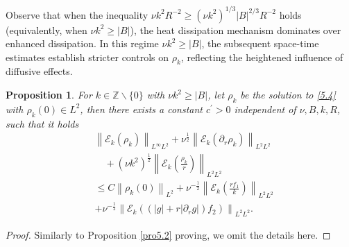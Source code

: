 \documentclass[final, 12pt,reqno]{amsart}
\newtheorem{proposition}[theorem]{\bf Proposition}
\numberwithin{equation}{section}
\begin{document}
Observe that when the inequality  $ \nu k^2R^{-2} \geq( \nu k^2)^{1/3}|B|^{2/3}R^{-2}$ holds (equivalently, when $\nu k^2 \geq  |B|$), the heat dissipation mechanism dominates over enhanced dissipation. In this regime $\nu k^2 \geq  |B|$, the subsequent space-time estimates establish stricter controls on  $\rho_k$, reflecting the heightened influence of diffusive effects.
\begin{proposition} \label{pro5.8}
    For $k \in \mathbb{Z} \backslash\{0\}$ with $\nu k^2\geq |B|$, let $\rho_k$ be the solution to \eqref{5.4} with $\rho_k(0) \in L^2$,  then there exists a constant $c^{\prime}>0$ independent of $\nu, B, k, R$, such that it holds
$$
    \begin{aligned}
        &   \left\|\mathcal{E}_k(\rho_k)\right\|_{L^\infty L^2}
        +\nu^{\frac{1}{2}}\left\|\mathcal{E}_k(\partial_{r}\rho_k)\right\|_{L^2L^2}\\
  &\quad+(\nu k^2)^{\frac{1}{2}}\left\|\mathcal{E}_k(\frac{\rho_k}{r})\right\|_{L^2L^2}\\
        &\leq C\left\|\rho_k(0)\right\|_{L^2}+\nu^{-\frac{1}{2}}\left\|\mathcal{E}_k(\frac{rf_1}{k})\right\|_{L^2 L^2}\\
        &+\nu^{-\frac{1}{2}}\left\|\mathcal{E}_k((|g|+r|\partial_{r}g|)f_2)\right\|_{L^2L^2}.
    \end{aligned}
    $$
\end{proposition}
\begin{proof}
    Similarly to Proposition \ref{pro5.2} proving, we omit the details here.
\end{proof}
\end{document}
